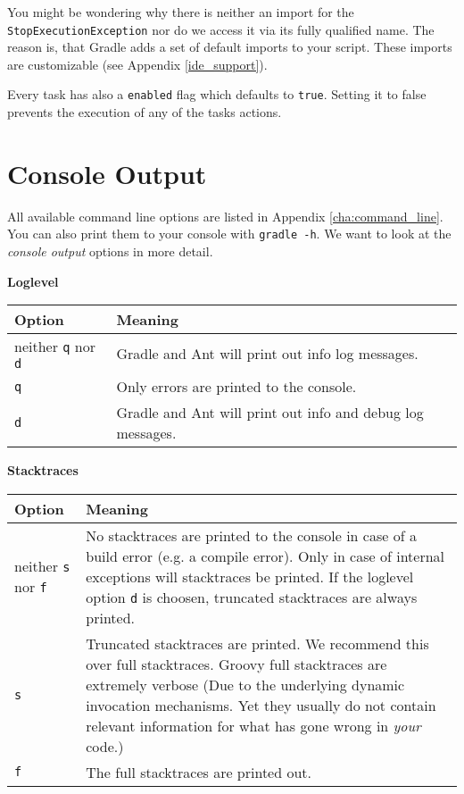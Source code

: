 You might be wondering why there is neither an import for the \texttt{StopExecutionException} nor do we access it via its fully qualified name. The reason is, that Gradle adds a set of default imports to your script. These imports are customizable (see Appendix \ref{ide_support}).

Every task has also a \texttt{enabled} flag which defaults to \texttt{true}. Setting it to false prevents the execution of any of the tasks actions.

\section{Console Output}
All available command line options are listed in Appendix \ref{cha:command_line}. You can also print them to your console with \texttt{gradle -h}. We want to look at the \emph{console output} options in more detail. 
\\

\centerline{\textbf{Loglevel}}
\medskip

\begin{tabular}{|l|l|} \hline
Option & Meaning  \\ \hline
neither \texttt{q} nor \texttt{d} & Gradle and Ant will print out info log messages.  \\ \hline
\texttt{q} & Only errors are printed to the console.  \\ \hline
\texttt{d} & Gradle and Ant will print out info and debug log messages. \\ \hline
\end{tabular}
\medskip

\centerline{\textbf{Stacktraces}}
\medskip

\begin{tabular}{|l|p{15cm}|} \hline
Option & Meaning  \\ \hline
neither \texttt{s} nor \texttt{f} & No stacktraces are printed to the console in case of a build error (e.g. a compile error). Only in case of internal exceptions will stacktraces be printed. If the loglevel option \texttt{d} is choosen, truncated stacktraces are always printed. \\ \hline
\texttt{s} & Truncated stacktraces are printed. We recommend this over full stacktraces. Groovy full stacktraces are extremely verbose (Due to the underlying dynamic invocation mechanisms. Yet they usually do not contain relevant information for what has gone wrong in \emph{your} code.)  \\ \hline
\texttt{f} & The full stacktraces are printed out. \\ \hline
\end{tabular}

